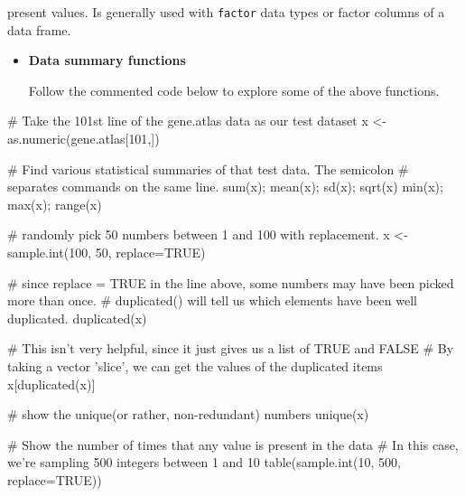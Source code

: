 \documentclass[a4paper]{book}
\newenvironment{Shaded}{}{}
\newcommand{\KeywordTok}[1]{\textcolor[rgb]{0.00,0.00,1.00}{{#1}}}
\newcommand{\DataTypeTok}[1]{{#1}}
\newcommand{\DecValTok}[1]{{#1}}
\newcommand{\StringTok}[1]{\textcolor[rgb]{0.00,0.50,0.50}{{#1}}}
\newcommand{\CommentTok}[1]{\textcolor[rgb]{0.00,0.50,0.00}{{#1}}}
\newcommand{\OtherTok}[1]{\textcolor[rgb]{1.00,0.25,0.00}{{#1}}}
\newcommand{\NormalTok}[1]{{#1}}
\newlength{\leftbarwidth}
\newlength{\leftbarsep}
\newcommand*{\leftbarcolorcmd}{\color{darkgray}}%
\renewenvironment{leftbar}{%
    \def\FrameCommand{{\leftbarcolorcmd{\vrule width \leftbarwidth\relax\hspace {\leftbarsep}}}}%
    \MakeFramed {\advance \hsize -\width \FrameRestore }%
}{%
    \endMakeFramed
}
\renewenvironment{Shaded}
{\vspace{0em}\begin{leftbar}\begin{snugshade}}
{\end{snugshade}\end{leftbar}\vspace{0pt}}
\newenvironment{rmdblock}[1]
  {\vspace{1.5em}\begin{shaded*}
  \begin{itemize}
  \renewcommand{\labelitemi}{
    \raisebox{-.7\height}[0pt][0pt]{
      {\setkeys{Gin}{width=3em,keepaspectratio}\texttt{[image: images/\#1]}}
    }
  }
  \item
  }
  {
  \end{itemize}
  \end{shaded*}
  }
\newenvironment{rmdexercise}
  {\begin{rmdblock}{exercise}}
  {\end{rmdblock}}
\begin{document}
present values. Is generally used with \texttt{factor} data types or
factor columns of a data frame. \textbar{}

\begin{rmdexercise}
\textbf{Data summary functions}

Follow the commented code below to explore some of the above functions.
\end{rmdexercise}

\begin{Shaded}
\begin{Highlighting}[]
\CommentTok{# Take the 101st line of the gene.atlas data as our test dataset}
\NormalTok{x <-}\StringTok{ }\KeywordTok{as.numeric}\NormalTok{(gene.atlas[}\DecValTok{101}\NormalTok{,])}

\CommentTok{# Find various statistical summaries of that test data. The semicolon}
\CommentTok{# separates commands on the same line.}
\KeywordTok{sum}\NormalTok{(x); }\KeywordTok{mean}\NormalTok{(x); }\KeywordTok{sd}\NormalTok{(x); }\KeywordTok{sqrt}\NormalTok{(x)}
\KeywordTok{min}\NormalTok{(x); }\KeywordTok{max}\NormalTok{(x); }\KeywordTok{range}\NormalTok{(x)}

\CommentTok{# randomly pick 50 numbers between 1 and 100 with replacement.}
\NormalTok{x <-}\StringTok{ }\KeywordTok{sample.int}\NormalTok{(}\DecValTok{100}\NormalTok{, }\DecValTok{50}\NormalTok{, }\DataTypeTok{replace=}\OtherTok{TRUE}\NormalTok{)}

\CommentTok{# since replace = TRUE in the line above, some numbers may have been picked more than once.}
\CommentTok{# duplicated() will tell us which elements have been well duplicated.}
\KeywordTok{duplicated}\NormalTok{(x)}

\CommentTok{# This isn't very helpful, since it just gives us a list of TRUE and FALSE}
\CommentTok{# By taking a vector 'slice', we can get the values of the duplicated items}
\NormalTok{x[}\KeywordTok{duplicated}\NormalTok{(x)]}

\CommentTok{# show the unique(or rather, non-redundant) numbers}
\KeywordTok{unique}\NormalTok{(x)}

\CommentTok{# Show the number of times that any value is present in the data}
\CommentTok{# In this case, we're sampling 500 integers between 1 and 10}
\KeywordTok{table}\NormalTok{(}\KeywordTok{sample.int}\NormalTok{(}\DecValTok{10}\NormalTok{, }\DecValTok{500}\NormalTok{, }\DataTypeTok{replace=}\OtherTok{TRUE}\NormalTok{))}
\end{Highlighting}
\end{Shaded}
\end{document}
